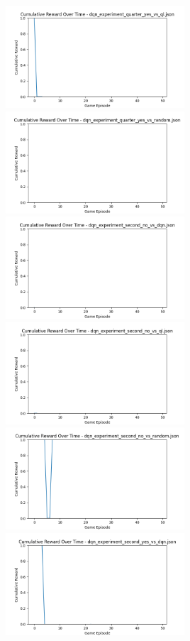 \includegraphics[width=0.5\textwidth]{images/cumulative_reward_dqn_experiment_quarter_yes_vs_ql.png} 
\includegraphics[width=0.5\textwidth]{images/cumulative_reward_dqn_experiment_quarter_yes_vs_random.png} 
\includegraphics[width=0.5\textwidth]{images/cumulative_reward_dqn_experiment_second_no_vs_dqn.png} 
\includegraphics[width=0.5\textwidth]{images/cumulative_reward_dqn_experiment_second_no_vs_ql.png} 
\includegraphics[width=0.5\textwidth]{images/cumulative_reward_dqn_experiment_second_no_vs_random.png} 
\includegraphics[width=0.5\textwidth]{images/cumulative_reward_dqn_experiment_second_yes_vs_dqn.png} 
